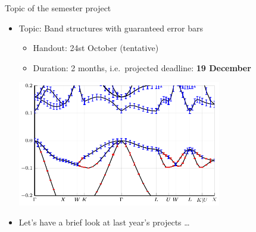 \begin{frame}{Topic of the semester project}
    \begin{itemize}
        \item Topic: \alert{Band structures with guaranteed error bars}
            \begin{itemize}
                \vspace{-0.5em}
                \item Handout: 24st October \textcolor{grey5}{(tentative)}
                \vspace{-0.5em}
                \item Duration: 2 months, i.e.~projected deadline: \textbf{19 December}
            \end{itemize}
        \vspace{1.5em}
        \begin{center}
        \includegraphics[width=0.7\textwidth]{img/si_band_errors.pdf}
        \end{center}
        \vspace{0.5em}
        \item Let's have a brief look at last year's projects \ldots
    \end{itemize}
\end{frame}

